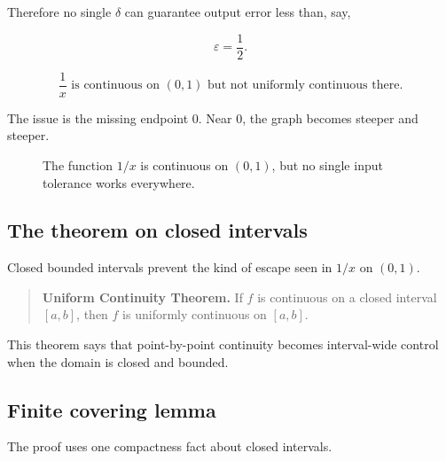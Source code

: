 Therefore no single \(\delta\) can guarantee output error less than, say,

\[
\varepsilon=\frac12.
\]

\[
\boxed{
\frac1x\text{ is continuous on }(0,1)\text{ but not uniformly continuous there.}
}
\]

The issue is the missing endpoint \(0\).  Near \(0\), the graph becomes steeper and
steeper.

\begin{figure}[h]
\centering
{}
\caption{The function \(1/x\) is continuous on \((0,1)\), but no single input tolerance works everywhere.}
\label{fig:one-over-x-not-uniform}
\end{figure}

\subsection{The theorem on closed intervals}
\label{appsubsec:uniform-continuity-theorem}

Closed bounded intervals prevent the kind of escape seen in \(1/x\) on \((0,1)\).

\begin{quote}
\textbf{Uniform Continuity Theorem.}
If \(f\) is continuous on a closed interval \([a,b]\), then \(f\) is uniformly continuous
on \([a,b]\).
\end{quote}

This theorem says that point-by-point continuity becomes interval-wide control when
the domain is closed and bounded.

\subsection{Finite covering lemma}
\label{appsubsec:finite-covering-lemma}

The proof uses one compactness fact about closed intervals.

